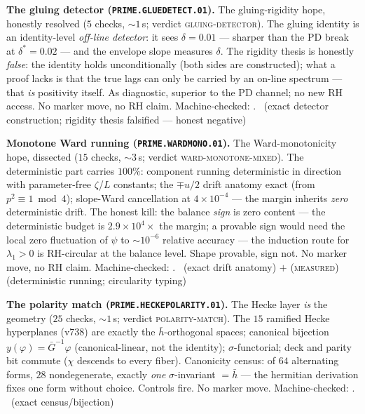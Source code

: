 \par\smallskip\noindent\textbf{The gluing detector
(\texttt{PRIME.GLUEDETECT.01}).}
The gluing-rigidity hope, honestly resolved ($5$ checks,
${\sim}1$\,s; verdict \textsc{gluing-detector}).  The gluing
identity is an identity-level \emph{off-line detector}: it sees
$\delta=0.01$ --- sharper than the PD break at $\delta^*=0.02$ ---
and the envelope slope measures $\delta$.  The rigidity thesis is
honestly \emph{false}: the identity holds unconditionally (both
sides are constructed); what a proof lacks is that the true lags
can only be carried by an on-line spectrum --- that \emph{is}
positivity itself.  As diagnostic, superior to the PD channel; no
new RH access.  No marker move, no RH claim.
Machine-checked: .
\mE\ (exact detector construction; rigidity thesis falsified ---
honest negative)
\par\smallskip


\par\smallskip\noindent\textbf{Monotone Ward running
(\texttt{PRIME.WARDMONO.01}).}
The Ward-monotonicity hope, dissected ($15$ checks, ${\sim}3$\,s;
verdict \textsc{ward-monotone-mixed}).  The deterministic part
carries $100\%$: component running deterministic in direction with
parameter-free $\zeta$/$L$ constants; the $\mp u/2$ drift anatomy
exact (from $p^2\equiv1\bmod4$); slope-Ward cancellation at
$4\times10^{-4}$ --- the margin inherits \emph{zero} deterministic
drift.  The honest kill: the balance \emph{sign} is zero content
--- the deterministic budget is $2.9\times10^4\times$ the margin;
a provable sign would need the local zero fluctuation of $\psi$ to
${\sim}10^{-6}$ relative accuracy --- the induction route for
$\lambda_1>0$ is RH-circular at the balance level.  Shape provable,
sign not.  No marker move, no RH claim.
Machine-checked: .
\mE\ (exact drift anatomy) $+$ (\textsc{measured}) (deterministic
running; circularity typing)
\par\smallskip


\par\smallskip\noindent\textbf{The polarity match
(\texttt{PRIME.HECKEPOLARITY.01}).}
The Hecke layer \emph{is} the geometry ($25$ checks, ${\sim}1$\,s;
verdict \textsc{polarity-match}).  The $15$ ramified Hecke
hyperplanes (v738) are exactly the $\bar h$-orthogonal spaces;
canonical bijection $y(\varphi)=\bar G^{-1}\varphi$
(canonical-linear, not the identity); $\sigma$-functorial; deck and
parity bit commute ($\chi$ descends to every fiber).  Canonicity
census: of $64$ alternating forms, $28$ nondegenerate, exactly
\emph{one} $\sigma$-invariant $=\bar h$ --- the hermitian
derivation fixes one form without choice.  Controls fire.  No
marker move.
Machine-checked: .
\mE\ (exact census/bijection)
\par\smallskip


